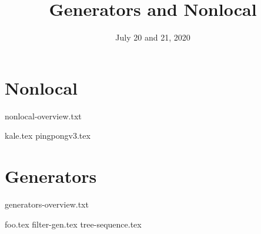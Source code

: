 \documentclass{exam}
\title{Generators and Nonlocal}
\date{July 20 and 21, 2020}
\begin{document}
\maketitle

\section{Nonlocal}
{nonlocal-overview.txt}
\begin{questions}
{kale.tex}
{pingpongv3.tex}
\end{questions}

\newpage

\section{Generators}
{generators-overview.txt}
\begin{questions}
{foo.tex}
{filter-gen.tex}
{tree-sequence.tex}
\end{questions}
\end{document}
